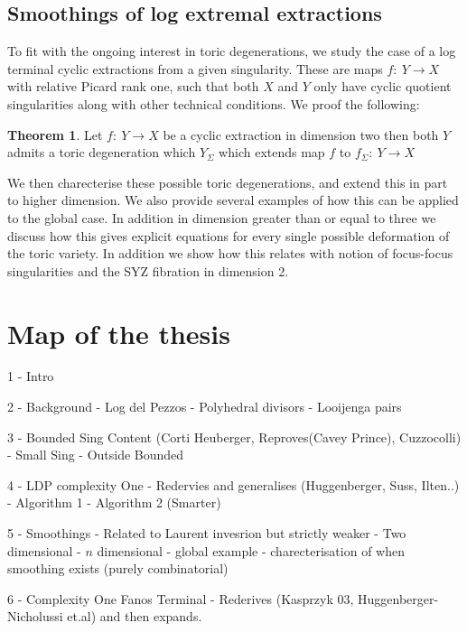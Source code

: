 \documentclass[12pt]{amsart}
\theoremstyle{definition}
\newtheorem{thm}{Theorem}[section]
\theoremstyle{definition}
\theoremstyle{definition}
\theoremstyle{definition}
\theoremstyle{definition}
\theoremstyle{definition}
\theoremstyle{definition}
\theoremstyle{definition}
\begin{document}
\subsection{Smoothings of log extremal extractions}

To fit with the ongoing interest in toric degenerations, we study the case of a log terminal cyclic extractions from a given singularity. These are maps $f: \: Y \rightarrow X$ with relative Picard rank one, such that both $X$ and $Y$ only have cyclic quotient singularities along with other technical conditions. We proof the following:

\begin{thm}
Let  $f: \: Y \rightarrow X$ be a cyclic extraction in dimension two then both $Y$ admits a toric degeneration which $Y_\Sigma$ which extends map $f$ to $f_\Sigma : \: Y \rightarrow X$
\end{thm}
We then charecterise these possible toric degenerations, and extend this in part to higher dimension. We also provide several examples of how this can be applied to the global case. In addition in dimension greater than or equal to three we discuss how this gives explicit equations for every single possible deformation of the toric variety. In addition we show how this relates with notion of focus-focus singularities and the SYZ fibration in dimension 2.


\section{Map of the thesis}

1 - Intro

2 - Background
	- Log del Pezzos
	- Polyhedral divisors
	- Looijenga pairs

3 - Bounded Sing Content (Corti Heuberger, Reproves(Cavey Prince), Cuzzocolli)
	- Small Sing
	- Outside Bounded

4 - LDP complexity One - Redervies and generalises (Huggenberger,  Suss, Ilten..)
	- Algorithm 1 
	- Algorithm 2 (Smarter)

5 - Smoothings - Related to Laurent invesrion but strictly weaker
	- Two dimensional
	- $n$ dimensional
	- global example
	- charecterisation of when smoothing exists (purely combinatorial)

6 - Complexity One Fanos Terminal - Rederives (Kasprzyk 03, Huggenberger-Nicholussi et.al) and then expands.
\end{document}
